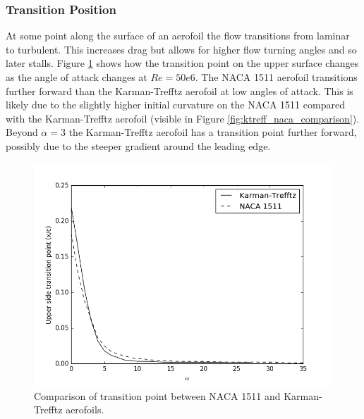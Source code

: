 \documentclass[10pt,a4paper]{article}
\begin{document}
\subsubsection{Transition Position}
At some point along the surface of an aerofoil the flow transitions from laminar to turbulent. This increases drag but allows for higher flow turning angles and so later stalls. Figure \ref{fig:transition_comparison} shows how the transition point on the upper surface changes as the angle of attack changes at $Re = 50e6$. The NACA 1511 aerofoil transitions further forward than the Karman-Trefftz aerofoil at low angles of attack. This is likely due to the slightly higher initial curvature on the NACA 1511 compared with the Karman-Trefftz aerofoil (visible in Figure \ref{fig:ktreff_naca_comparison}). Beyond $\alpha = 3$ the Karman-Trefftz aerofoil has a transition point further forward, possibly due to the steeper gradient around the leading edge.
\begin{figure}[!htb]
\centering
\includegraphics[scale=0.6]{Figures/transition_comparison.png}
\caption{Comparison of transition point between NACA 1511 and Karman-Trefftz aerofoils.}
\label{fig:transition_comparison}
\end{figure}
\end{document}
